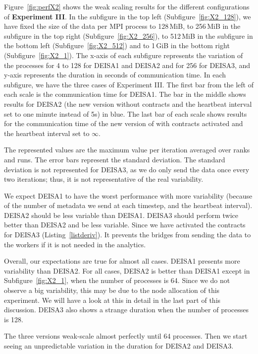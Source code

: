 Figure~\ref{fig:perfX2} shows the weak scaling results for the different configurations of \textbf{Experiment III}. 
In the subfigure in the top left (Subfigure~\ref{fig:X2_128}), we have fixed the size of the data per MPI process to 128\,MiB, to 256\,MiB in the subfigure in the top right (Subfigure~\ref{fig:X2_256}), to 512\,MiB in the subfigure in the bottom left (Subfigure~\ref{fig:X2_512}) and to 1\,GiB in the bottom right (Subfigure~\ref{fig:X2_1}). 
The x-axis of each subfigure represents the variation of the processes for 4 to 128 for DEISA1 and DEISA2 and for 256 for DEISA3, and y-axis represents the duration in seconds of communication time. 
In each subfigure, we have the three cases of Experiment III. The first bar from the left of each scale  is the communication time for DEISA1. The bar in the middle shows results for DEISA2 (the new version without contracts and the heartbeat interval set to one minute instead of 5s) in blue. The last bar of each scale shows results for the communication time of the new version of \deisa with contracts activated and the heartbeat interval set to $\infty$. 

The represented values are the maximum value per iteration averaged over ranks and runs. The error bars represent the standard deviation. The standard deviation is not represented for DEISA3, as we do only send the data once every two iterations; thus, it is not representative of the real variability. 

We expect DEISA1 to have the worst performance with more variability (because of the number of metadata we send at each timestep, and the heartbeat interval). DEISA2 should be less variable than DEISA1. 
DEISA3 should perform twice better than DEISA2 and be less variable. 
Since we have activated the contracts for DEISA3 (Listing~\ref{listderiv}). It prevents the bridges from sending the data to the workers if it is not needed in the analytics. 

Overall, our expectations are true for almost all cases. DEISA1 presents more variability than DEISA2. For all cases, DEISA2 is better than DEISA1 except in Subfigure~\ref{fig:X2_1}, when the number of processes is 64. Since we do not observe a big variability, this may be due to the node allocation of this experiment. We will have a look at this in detail in the last part of this discussion.
DEISA3 also shows a strange duration when the number of processes is 128.

The three versions weak-scale almost perfectly until 64 processes. Then we start seeing an unpredictable variation in the duration for DEISA2 and DEISA3.  

